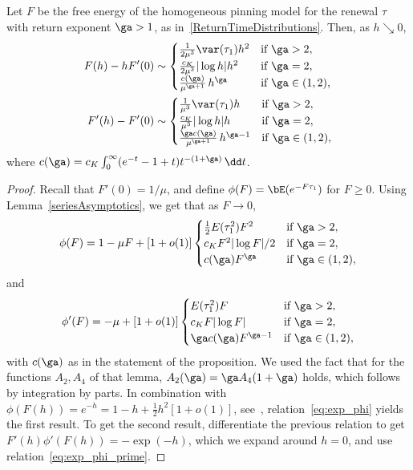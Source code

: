 \begin{prop}\label{pr:asympt.hom.free.energy}
Let $F$ be the free energy of the homogeneous pinning model for the renewal $\tau$ with return exponent $\ga > 1$, as in~\eqref{ReturnTimeDistributions}. Then, as $h \searrow 0$,
\begin{equation}\label{eq:asymptoticsFh}
\begin{aligned}
F(h) - h F'(0) &\sim
\begin{cases}
\frac{1}{2 \mu^3} \var(\tau_1) h^2 & \text{if } \ga > 2,\\
\frac{c_K}{2 \mu^3} |\log h| h^2 & \text{if } \ga = 2,\\
\frac{c(\ga)}{\mu^{\ga + 1}} \, h^{\ga} & \text{if } \ga \in (1,2),
\end{cases}\\
F'(h) - F'(0) &\sim
\begin{cases}
\frac{1}{\mu^3} \var(\tau_1) h & \text{if } \ga > 2,\\
\frac{c_K}{\mu^3} |\log h| h & \text{if } \ga = 2,\\
\frac{\ga c(\ga)}{\mu^{\ga + 1}} \, h^{\ga - 1} & \text{if } \ga \in(1,2),
\end{cases}
\end{aligned}
\end{equation}
where $c(\ga) = c_K \int_0^\infty (e^{- t} - 1 + t) t^{- (1 + \ga)} \, \dd t$.
\end{prop}

\begin{proof}
Recall that $F'(0) = 1/\mu$, and define $\phi(F) = \bE(e^{- F \tau_1})$ for $F\geq 0$. Using Lemma~\ref{seriesAsymptotics}, we get that as $F\to 0$,
\begin{equation}\label{eq:exp_phi}
\phi(F) = 1 - \mu F + [1 + o(1)]
\begin{cases}
\frac{1}{2} E(\tau_1^2) F^2 & \text{if } \ga > 2,\\
c_K F^2|\log F|/2 & \text{if } \ga =2,\\
c(\ga) F^\ga & \text{if } \ga \in (1,2),
\end{cases}
\end{equation}
and
\begin{equation}\label{eq:exp_phi_prime}
\phi'(F) = - \mu + [1 + o(1)]
\begin{cases}
E(\tau_1^2) F & \text{if } \ga > 2,\\
c_K F |\log F| & \text{if } \ga =2,\\
\ga c(\ga) F^{\ga-1} & \text{if } \ga \in (1,2),
\end{cases}
\end{equation}
with $c(\ga)$ as in the statement of the proposition. We used the fact that for the functions $A_2, A_4$ of that lemma, $A_2(\ga)=\ga A_4(1+\ga)$ holds, which follows by integration by parts. In combination with $\phi(F(h)) = e^{- h} = 1 - h + \frac{1}{2} h^2 [1 + o(1)]$, see~\cite[Section~2.1, Equation (2.2)]{Gi2007}, relation~\eqref{eq:exp_phi} yields the first result. To get the second result, differentiate the previous relation to get $F'(h) \phi' (F(h)) = - \exp(- h)$, which we expand around $h = 0$, and use relation~\eqref{eq:exp_phi_prime}.
\end{proof}


